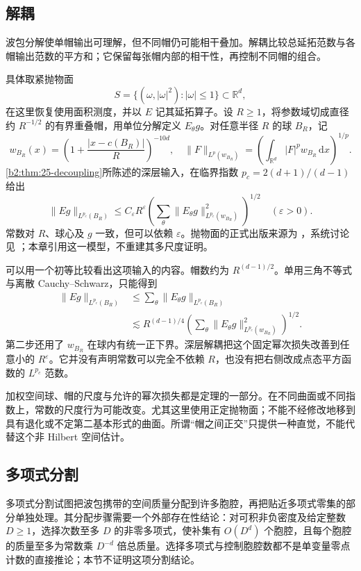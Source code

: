 \subsection{解耦}
\label{b2:subsec:230604}

波包分解使单帽输出可理解，但不同帽仍可能相干叠加。解耦比较总延拓范数与各帽输出范数的平方和；它保留每张帽内部的相干性，再控制不同帽的组合。

具体取紧抛物面
\[
 S=\{(\omega,|\omega|^2):|\omega|\leq1\}\subset\mathbb R^d,
\]
在这里恢复使用面积测度，并以 \(E\) 记其延拓算子。设 \(R\geq1\)，将参数域切成直径约 \(R^{-1/2}\) 的有界重叠帽，用单位分解定义 \(E_\theta g\)。对任意半径 \(R\) 的球 \(B_R\)，记
\[
 w_{B_R}(x)=\left(1+\frac{|x-c(B_R)|}{R}\right)^{-10d},\quad
 \|F\|_{L^p(w_{B_R})}
 =\left(\int_{\mathbb R^d}|F|^p w_{B_R}\,\mathrm dx\right)^{1/p}.
\]
\cref{b2:thm:25-decoupling}所陈述的深层输入，在临界指数 \(p_c=2(d+1)/(d-1)\) 给出
\[
 \|Eg\|_{L^{p_c}(B_R)}
 \leq C_\varepsilon R^\varepsilon
       \left(\sum_\theta
          \|E_\theta g\|_{L^{p_c}(w_{B_R})}^2
       \right)^{1/2}
 \quad(\varepsilon>0).
\]
常数对 \(R\)、球心及 \(g\) 一致，但可以依赖 \(\varepsilon\)。抛物面的正式出版来源为 \cite{BourgainDemeter2015Proof}，系统讨论见 \cite{Demeter2020Fourier}；本章引用这一模型，不重建其多尺度证明。

\ProseParagraphBreak
可以用一个初等比较看出这项输入的内容。帽数约为 \(R^{(d-1)/2}\)。单用三角不等式与离散 Cauchy--Schwarz，只能得到
\[
 \begin{aligned}
 \|Eg\|_{L^{p_c}(B_R)}
 &\leq\sum_\theta\|E_\theta g\|_{L^{p_c}(B_R)}\\
 &\lesssim R^{(d-1)/4}
   \left(\sum_\theta
      \|E_\theta g\|_{L^{p_c}(w_{B_R})}^2
   \right)^{1/2}.
 \end{aligned}
\]
第二步还用了 \(w_{B_R}\) 在球内有统一正下界。深层解耦把这个固定幂次损失改善到任意小的 \(R^\varepsilon\)。它并没有声明常数可以完全不依赖 \(R\)，也没有把右侧改成点态平方函数的 \(L^{p_c}\) 范数。

加权空间球、帽的尺度与允许的幂次损失都是定理的一部分。在不同曲面或不同指数上，常数的尺度行为可能改变。尤其这里使用正定抛物面；不能不经修改地移到具有退化或不定第二基本形式的曲面。所谓“帽之间正交”只提供一种直觉，不能代替这个非 Hilbert 空间估计。

\subsection{多项式分割}
\label{b2:subsec:230605}

多项式分割试图把波包携带的空间质量分配到许多胞腔，再把贴近多项式零集的部分单独处理。其分配步骤需要一个外部存在性结论：对可积非负密度及给定整数 \(D\geq1\)，选择次数至多 \(D\) 的非零多项式，使补集有 \(O(D^d)\) 个胞腔，且每个胞腔的质量至多为常数乘 \(D^{-d}\) 倍总质量。选择多项式与控制胞腔数都不是单变量零点计数的直接推论；本节不证明这项分割结论。

